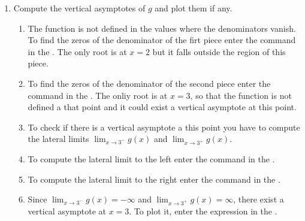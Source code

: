 \begin{enumerate}[leftmargin=*]
\begin{enumerate}
      \item Compute the vertical asymptotes of $g$ and plot them if any.
            \begin{indication}
            \begin{enumerate}
            \item The function is not defined in the values where the denominators vanish.
                  To find the zeros of the denominator of the firt piece enter the command  in the .
                  The only root is at $x=2$ but it falls outside the region of this piece.
            \item To find the zeros of the denominator of the second piece enter the command  in the .
                  The onliy root is at $x=3$, so that the function is not defined a that point and it could exist a vertical asymptote at this point.
            \item To check if there is a vertical asymptote a this point you have to compute the lateral limits  $\lim_{x\rightarrow 3^-}g(x)$ and $\lim_{x\rightarrow 3^+}g(x)$.
            \item To compute the lateral limit to the left enter the command  in the .
            \item To compute the lateral limit to the right enter the command  in the .
            \item Since $\lim_{x\rightarrow 3^-}g(x)=-\infty$ and $\lim_{x\rightarrow 3^+}g(x)=\infty$, there exist a vertical asymptote at $x=3$.
                  To plot it, enter the expression  in the .
            \end{enumerate}
            \end{indication}


\end{enumerate}
\end{enumerate}
